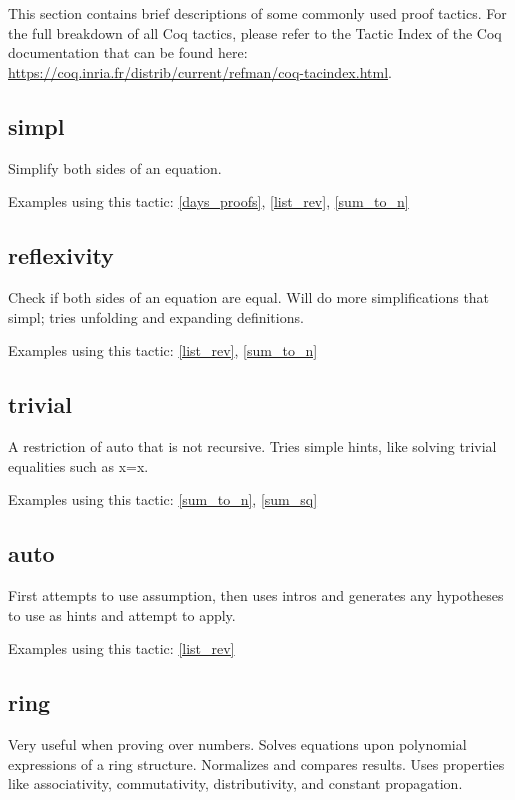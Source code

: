 
This section contains brief descriptions of some commonly used proof tactics.
For the full breakdown of all Coq tactics, please refer to the Tactic Index of the Coq documentation that can be found here:
\url{https://coq.inria.fr/distrib/current/refman/coq-tacindex.html}.


\subsection{simpl} \label{simpl}
Simplify both sides of an equation.

\noindent
Examples using this tactic: 
\ref{days_proofs}, \ref{list_rev}, \ref{sum_to_n}




\subsection{reflexivity} \label{reflexivity}
Check if both sides of an equation are equal. 
Will do more simplifications that simpl; tries unfolding and expanding definitions.

\noindent
Examples using this tactic: 
\ref{list_rev}, \ref{sum_to_n}




\subsection{trivial} \label{trivial}
A restriction of auto that is not recursive. 
Tries simple hints, like solving trivial equalities such as x=x.

\noindent
Examples using this tactic: 
\ref{sum_to_n}, \ref{sum_sq}




\subsection{auto} \label{auto}
First attempts to use assumption, then uses intros and generates any hypotheses to use as hints and attempt to apply.

\noindent
Examples using this tactic: 
\ref{list_rev}




\subsection{ring} \label{ring}
Very useful when proving over numbers.
Solves equations upon polynomial expressions of a ring structure. 
Normalizes and compares results.
Uses properties like associativity, commutativity, distributivity, and constant propagation.

